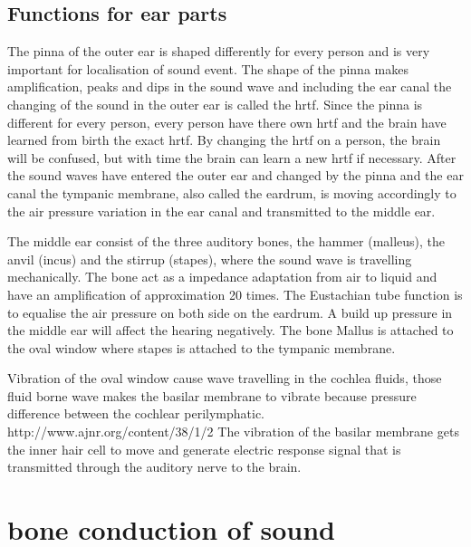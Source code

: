 \subsection{Functions for ear parts}
The pinna of the outer ear is shaped differently for every person and is very important for localisation of sound event. The shape of the pinna makes amplification, peaks and dips in the sound wave and including the ear canal the changing of the sound in the outer ear is called the \gls{hrtf}. Since the pinna is different for every person, every person have there own \gls{hrtf} and the brain have learned from birth the exact \gls{hrtf}. By changing the \gls{hrtf} on a person, the brain will be confused, but with time the brain can learn a new \gls{hrtf} if necessary. After the sound waves have entered the outer ear and changed by the pinna and the ear canal the tympanic membrane, also called the eardrum, is moving accordingly to the air pressure variation in the ear canal and transmitted to the middle ear.  

The middle ear consist of the three auditory bones, the hammer (malleus), the anvil (incus) and the stirrup (stapes), where the sound wave is travelling mechanically. The bone act as a impedance adaptation from air to liquid and have an amplification of approximation 20 times. The Eustachian tube function is to equalise the air pressure on both side on the eardrum. A build up pressure in the middle ear will affect the hearing negatively. The bone Mallus is attached to the oval window where stapes is attached to the tympanic membrane.

Vibration of the oval window cause wave travelling in the cochlea fluids, those fluid borne wave makes the basilar membrane to vibrate because pressure difference between the cochlear perilymphatic.  http://www.ajnr.org/content/38/1/2 The vibration of the basilar membrane gets the inner hair cell to move and generate electric response signal that is transmitted through the auditory nerve to the brain.



\section{bone conduction of sound}

